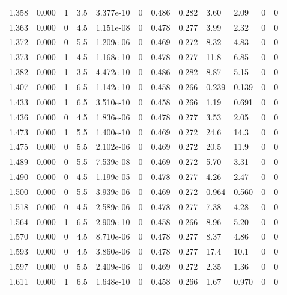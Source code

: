 \documentclass[preview]{standalone}
\begin{document}
{{{\begin{tabular}{L{1.2cm}C{1.2cm} C{0.3cm}C{0.5cm} C{1.4cm}C{1.4cm} C{1.4cm}C{1.4cm} C{1.6cm}C{1.6cm} C{1.6cm}C{1.6cm}}
  1.358  &  0.000  & 1     & 3.5 &  3.377e-10  & 0  &  0.486&   0.282& 3.60 & 2.09   &  0 & 0  \\ 
  1.363  &  0.000  & 0     & 4.5 &  1.151e-08  & 0  &  0.478&   0.277& 3.99 & 2.32   &  0 & 0  \\ 
  1.372  &  0.000  & 0     & 5.5 &  1.209e-06  & 0  &  0.469&   0.272& 8.32 & 4.83   &  0 & 0  \\ 
  1.373  &  0.000  & 1     & 4.5 &  1.168e-10  & 0  &  0.478&   0.277& 11.8 & 6.85   &  0 & 0  \\ 
  1.382  &  0.000  & 1     & 3.5 &  4.472e-10  & 0  &  0.486&   0.282& 8.87 & 5.15   &  0 & 0  \\ 
  1.407  &  0.000  & 1     & 6.5 &  1.142e-10  & 0  &  0.458&   0.266& 0.239 & 0.139   &  0 & 0  \\ 
  1.433  &  0.000  & 1     & 6.5 &  3.510e-10  & 0  &  0.458&   0.266& 1.19 & 0.691   &  0 & 0  \\ 
  1.436  &  0.000  & 0     & 4.5 &  1.836e-06  & 0  &  0.478&   0.277& 3.53 & 2.05   &  0 & 0  \\ 
  1.473  &  0.000  & 1     & 5.5 &  1.400e-10  & 0  &  0.469&   0.272& 24.6 & 14.3   &  0 & 0  \\ 
  1.475  &  0.000  & 0     & 5.5 &  2.102e-06  & 0  &  0.469&   0.272& 20.5 & 11.9   &  0 & 0  \\ 
  1.489  &  0.000  & 0     & 5.5 &  7.539e-08  & 0  &  0.469&   0.272& 5.70 & 3.31   &  0 & 0  \\ 
  1.490  &  0.000  & 0     & 4.5 &  1.199e-05  & 0  &  0.478&   0.277& 4.26 & 2.47   &  0 & 0  \\ 
  1.500  &  0.000  & 0     & 5.5 &  3.939e-06  & 0  &  0.469&   0.272& 0.964 & 0.560   &  0 & 0  \\ 
  1.518  &  0.000  & 0     & 4.5 &  2.589e-06  & 0  &  0.478&   0.277& 7.38 & 4.28   &  0 & 0  \\ 
  1.564  &  0.000  & 1     & 6.5 &  2.909e-10  & 0  &  0.458&   0.266& 8.96 & 5.20   &  0 & 0  \\ 
  1.570  &  0.000  & 0     & 4.5 &  8.710e-06  & 0  &  0.478&   0.277& 8.37 & 4.86   &  0 & 0  \\ 
  1.593  &  0.000  & 0     & 4.5 &  3.860e-06  & 0  &  0.478&   0.277& 17.4 & 10.1   &  0 & 0  \\ 
  1.597  &  0.000  & 0     & 5.5 &  2.409e-06  & 0  &  0.469&   0.272& 2.35 & 1.36   &  0 & 0  \\ 
  1.611  &  0.000  & 1     & 6.5 &  1.648e-10  & 0  &  0.458&   0.266& 1.67 & 0.970   &  0 & 0  \\ 

\end{tabular}}}}
\end{document}
